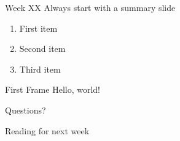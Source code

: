 \documentclass[aspectratio=169]{beamer}
\newcommand{\weekNumber}{XX}
\begin{document}
\maketitle

\begin{frame}{Week \weekNumber}
  Always start with a summary slide
  \begin{enumerate}
  \item First item
  \item Second item
  \item Third item
  \end{enumerate}
  \end{frame}

\begin{frame}{First Frame}
    Hello, world!
  \end{frame}

\begin{frame}[standout]
  Questions?
\end{frame}

\begin{frame}[allowframebreaks]{Reading for next week}

  

\end{frame}
\end{document}
